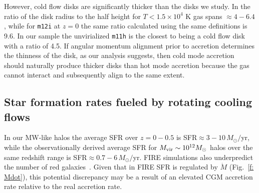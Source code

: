 \documentclass[fleqn,usenatbib]{mnras}
\newcommand{\Mdot}{\dot{M}}
\begin{document}
However, cold flow disks are significantly thicker than the disks we study.
In \cite{Dekel2020a} the ratio of the disk radius to the half height for $T < 1.5 \times 10^4$ K gas spans $\approx 4-6.4$, while for \texttt{m12i} at $z=0$ the same ratio calculated using the same definitions is 9.6.
In our sample the unvirialized \texttt{m11h} is the closest to being a cold flow disk with a ratio of 4.5.
If angular momentum alignment prior to accretion determines the thinness of the disk, as our analysis suggests, then cold mode accretion should naturally produce thicker disks than hot mode accretion because the gas cannot interact and subsequently align to the same extent.

\subsection{Star formation rates fueled by rotating cooling flows}
\label{s: fueling}

In our MW-like halos the average SFR over $z=0-0.5$ is SFR$\approx 3-10\,M_\odot/$yr, while the observationally derived average SFR for $M_{\rm vir} \sim 10^{12} M_\odot$ halos over the same redshift range is SFR$\approx 0.7-6\,M_\odot/$yr.
FIRE simulations also underpredict the number of red galaxies~\citep{Garrison-Kimmel2017}.
Given that in FIRE SFR is regulated by $\Mdot$ (Fig.~\ref{f: Mdot}), this potential discrepancy may be a result of an elevated CGM accretion rate relative to the real accretion rate.
\end{document}
